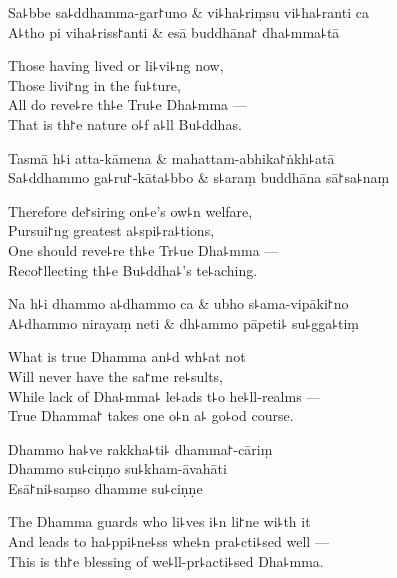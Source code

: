 \begin{twochants}
  Sa꜕bbe sa꜕ddhamma-gar꜓uno & vi꜕ha꜕riṃsu vi꜕ha꜕ranti ca \\
  A꜕tho pi viha꜕riss꜓anti & esā buddhāna꜓ dha꜕mma꜕tā \\
\end{twochants}

\begin{english}
  Those having lived or li꜕vi꜕ng now,\\
  Those livi꜓ng in the fu꜕ture,\\
  All do reve꜕re th꜕e Tru꜕e Dha꜕mma ---\\
  That is th꜓e nature o꜕f a꜕ll Bu꜕ddhas.
\end{english}

\begin{twochants}
  Tasmā h꜕i atta-kāmena & mahattam-abhika꜓ṅkh꜕atā \\
  Sa꜕ddhammo ga꜕ru꜓-kāta꜕bbo & s꜕araṃ buddhāna sā꜓sa꜕naṃ \\
\end{twochants}

\begin{english}
  Therefore de꜓siring on꜕e's ow꜕n welfare,\\
  Pursui꜓ng greatest a꜕spi꜕ra꜕tions,\\
  One should reve꜕re th꜕e Tr꜕ue Dha꜕mma ---\\
  Reco꜓llecting th꜕e Bu꜕ddha꜕'s te꜕aching.
\end{english}

\begin{twochants}
  Na h꜕i dhammo a꜕dhammo ca & ubho s꜕ama-vipāki꜓no \\
  A꜕dhammo nirayaṃ neti & dh꜕ammo pāpeti꜕ su꜕gga꜕tiṃ \\
\end{twochants}

\begin{english}
  What is true Dhamma an꜕d wh꜕at not\\
  Will never have the sa꜓me re꜕sults,\\
  While lack of Dha꜕mma꜕ le꜕ads t꜕o he꜕ll-realms ---\\
  True Dhamma꜓ takes one o꜕n a꜕ go꜕od course.
\end{english}

Dhammo ha꜕ve rakkha꜕ti꜕ dhamma꜓-cāriṃ\\
Dhammo su꜕ciṇṇo su꜕kham-āvahāti\\
Esā꜓ni꜕saṃso dhamme su꜕ciṇṇe

\begin{english}
  The Dhamma guards who li꜕ves i꜕n li꜓ne wi꜕th it\\
  And leads to ha꜕ppi꜕ne꜕ss whe꜕n pra꜕cti꜕sed well ---\\
  This is th꜓e blessing of we꜕ll-pr꜕acti꜕sed Dha꜕mma.
\end{english}

